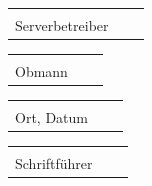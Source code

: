 \documentclass[parskip=half]{scrreprt}
\begin{document}
\begin{tabular}{p{7cm}p{0.5cm}l}
\dotfill \\
Serverbetreiber
\end{tabular}
\hfill
\begin{tabular}{p{7cm}p{0.5cm}l}
\dotfill \\
Obmann
\end{tabular}

\vspace{1cm}
\begin{tabular}{p{7cm}p{0.5cm}l}
\dotfill \\
Ort, Datum
\end{tabular}
\hfill
\begin{tabular}{p{7cm}p{0.5cm}l}
\dotfill \\
Schriftführer
\end{tabular}


\end{document}
